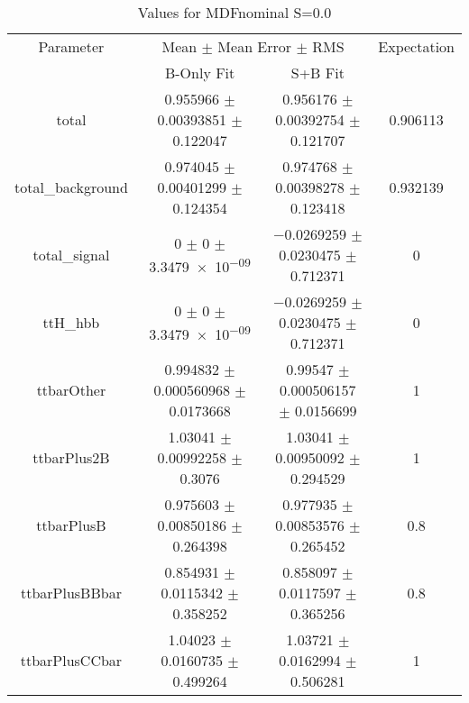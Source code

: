 \begin{table}
\centering
\caption{Values for MDFnominal S=0.0}
\begin{tabular}{cccc}
\toprule
Parameter & \multicolumn{2}{c}{Mean $\pm$ Mean Error $\pm$ RMS} & Expectation\\
 & B-Only Fit & S+B Fit & \\
\midrule
total & \num{0.955966} $\pm$ \num{0.00393851} $\pm$ \num{0.122047} & \num{0.956176} $\pm$ \num{0.00392754} $\pm$ \num{0.121707} & \num{0.906113}\\
total\_background & \num{0.974045} $\pm$ \num{0.00401299} $\pm$ \num{0.124354} & \num{0.974768} $\pm$ \num{0.00398278} $\pm$ \num{0.123418} & \num{0.932139}\\
total\_signal & \num{0} $\pm$ \num{0} $\pm$ \num{3.3479e-09} & \num{-0.0269259} $\pm$ \num{0.0230475} $\pm$ \num{0.712371} & \num{0}\\
ttH\_hbb & \num{0} $\pm$ \num{0} $\pm$ \num{3.3479e-09} & \num{-0.0269259} $\pm$ \num{0.0230475} $\pm$ \num{0.712371} & \num{0}\\
ttbarOther & \num{0.994832} $\pm$ \num{0.000560968} $\pm$ \num{0.0173668} & \num{0.99547} $\pm$ \num{0.000506157} $\pm$ \num{0.0156699} & \num{1}\\
ttbarPlus2B & \num{1.03041} $\pm$ \num{0.00992258} $\pm$ \num{0.3076} & \num{1.03041} $\pm$ \num{0.00950092} $\pm$ \num{0.294529} & \num{1}\\
ttbarPlusB & \num{0.975603} $\pm$ \num{0.00850186} $\pm$ \num{0.264398} & \num{0.977935} $\pm$ \num{0.00853576} $\pm$ \num{0.265452} & \num{0.8}\\
ttbarPlusBBbar & \num{0.854931} $\pm$ \num{0.0115342} $\pm$ \num{0.358252} & \num{0.858097} $\pm$ \num{0.0117597} $\pm$ \num{0.365256} & \num{0.8}\\
ttbarPlusCCbar & \num{1.04023} $\pm$ \num{0.0160735} $\pm$ \num{0.499264} & \num{1.03721} $\pm$ \num{0.0162994} $\pm$ \num{0.506281} & \num{1}\\
\bottomrule
\end{tabular}
\end{table}